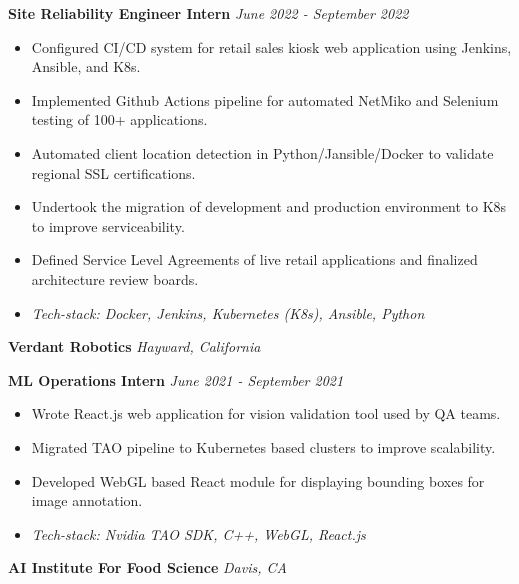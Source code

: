 \documentclass[11pt]{article}
\begin{document}
\textbf{Site Reliability Engineer Intern} \hfill \textit{June 2022 - September 2022}
\begin{itemize}[noitemsep, topsep=0pt, partopsep=0pt, parsep=0pt]
    \item Configured CI/CD system for retail sales kiosk web application using Jenkins, Ansible, and K8s.
    \item Implemented Github Actions pipeline for automated NetMiko and Selenium testing of 100+ applications.
    \item Automated client location detection in Python/Jansible/Docker to validate regional SSL certifications.
    \item Undertook the migration of development and production environment to K8s to improve serviceability.
    \item Defined Service Level Agreements of live retail applications and finalized architecture review boards.
    \item \textit{Tech-stack: Docker, Jenkins, Kubernetes (K8s), Ansible, Python}
\end{itemize}

\vspace{8pt}

\textbf{Verdant Robotics} \hfill \textit{Hayward, California}

\textbf{ML Operations Intern} \hfill \textit{June 2021 - September 2021} 
\begin{itemize}[noitemsep, topsep=0pt, partopsep=0pt, parsep=0pt]
    \item Wrote React.js web application for vision validation tool used by QA teams.
    \item Migrated TAO pipeline to Kubernetes based clusters to improve scalability.
    \item Developed WebGL based React module for displaying bounding boxes for image annotation.
    \item \textit{Tech-stack: Nvidia TAO SDK, C++, WebGL, React.js}
\end{itemize}

\vspace{8pt}

\textbf{AI Institute For Food Science}	\hfill \textit{Davis, CA}
\end{document}
